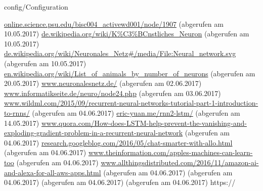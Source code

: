 \documentclass[12pt,headsepline,oneside,ngerman]{scrreprt}
\begin{document}
\graphicspath{{figures/}}

 {config/Configuration}
\pagestyle{headings}






%
%
%
%
%
%


%

\cleardoublepage
\begin{thebibliography}{xxxx}
\url{online.science.psu.edu/bisc004_activewd001/node/1907} (abgerufen am 10.05.2017)
\url{de.wikipedia.org/wiki/K%C3%BCnstliches_Neuron} (abgerufen am 10.05.2017)
\url{de.wikipedia.org/wiki/Neuronales_Netz#/media/File:Neural_network.svg} (abgerufen am 10.05.2017)
\url{en.wikipedia.org/wiki/List_of_animals_by_number_of_neurons} (abgerufen am 20.05.2017)
\url{www.neuronalesnetz.de/} (abgerufen am 02.06.2017)
\url{www.informatikseite.de/neuro/node24.php} (abgerufen am 03.06.2017)
\url{www.wildml.com/2015/09/recurrent-neural-networks-tutorial-part-1-introduction-to-rnns/} (abgerufen am 04.06.2017)
\url{eric-yuan.me/rnn2-lstm/} (abgerufen am 14.05.2017)
\url{www.quora.com/How-does-LSTM-help-prevent-the-vanishing-and-exploding-gradient-problem-in-a-recurrent-neural-network} (abgerufen am 04.06.2017)
\url{research.googleblog.com/2016/05/chat-smarter-with-allo.html} (abgerufen am 04.06.2017)
\url{www.theinformation.com/apples-machines-can-learn-too} (abgerufen am 04.06.2017)
\url{www.allthingsdistributed.com/2016/11/amazon-ai-and-alexa-for-all-aws-apps.html} (abgerufen am 04.06.2017)
\url{} (abgerufen am 04.06.2017)
\url{} (abgerufen am 04.06.2017)
\url{} (abgerufen am 04.06.2017)
https://

\end{thebibliography}
\renewcommand{\bibname}{Literaturverzeichnis}

%

\cleardoublepage
{}
\listoffigures
\end{document}
